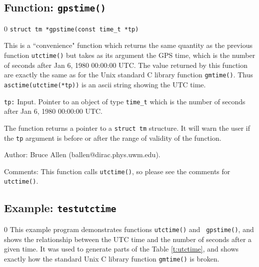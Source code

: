\clearpage
\subsection{Function: {\tt gpstime()} }
\setcounter{equation}0
{\tt struct tm *gpstime(const time\_t *tp) }

This is a ``convenience" function which returns the same quantity as
the previous function {\tt utctime()} but takes as its argument the GPS
time, which is the number of seconds after Jan 6, 1980 00:00:00 UTC.
The value returned by this function are exactly the same as for the Unix
standard C library function {\tt gmtime()}.  Thus {\tt
asctime(utctime(*tp))} is an ascii string showing the UTC time.


\begin{description}
\item{\tt tp:} Input.  Pointer to an object of type {\tt time\_t} which is the number
of seconds after Jan 6, 1980 00:00:00 UTC.
\end{description}
The function returns a pointer to a {\tt struct tm} structure.  It will
warn the user if the {\tt tp} argument is before or after the range of
validity of the function.
\begin{description}
\item{Author:}
Bruce Allen (ballen@dirac.phys.uwm.edu).
\item{Comments:}
This function calls {\tt utctime()}, so please see the comments for {\tt utctime()}.
\end{description}


\clearpage
\subsection{Example: {\tt testutctime} }
\setcounter{equation}0
This example program demonstrates functions {\tt utctime()} and {\tt
gpstime()}, and shows the relationship between the UTC time and the
number of seconds after a given time.  It was used to generate parts
of the Table \ref{t:utctime}, and shows exactly how the standard Unix
C library function {\tt gmtime()} is broken.

